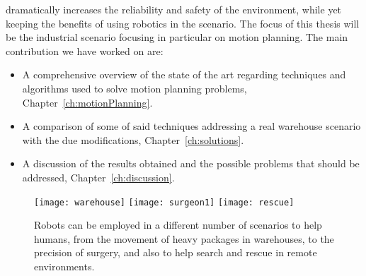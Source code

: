 dramatically increases the reliability and safety of the environment, while yet
keeping the benefits of using robotics in the scenario. \newline
The focus of this thesis will be the industrial scenario focusing in 
particular on motion planning. The main contribution we have worked on are:
\begin{itemize}
  \item A comprehensive overview of the state of the art regarding techniques 
    and algorithms used to solve motion planning problems, 
    Chapter~\ref{ch:motionPlanning}.
  \item A comparison of some of said techniques addressing a real warehouse
    scenario with the due modifications, Chapter~\ref{ch:solutions}. 
  \item A discussion of the results obtained and the possible problems that
    should be addressed, Chapter~\ref{ch:discussion}.  
\end{itemize}
\begin{figure}[tb]
  \centering
  \texttt{[image: warehouse]}
  \texttt{[image: surgeon1]}
  \texttt{[image: rescue]}
  \caption{Robots can be employed in a different number of scenarios to help
  humans, from the movement of heavy packages in warehouses, to the precision
  of surgery, and also to help search and rescue in remote environments.}
  \label{fig:robot_examples}
\end{figure}
